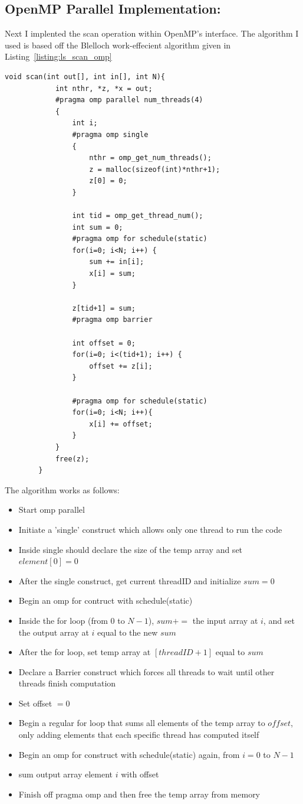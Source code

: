 	\newpage
	\subsection{OpenMP Parallel Implementation:}
	Next I implented the scan operation within OpenMP's interface. The algorithm I used is based off the Blelloch\cite{Prefixsumwiki} work-effecient algorithm given in Listing~\ref{listing:ls_scan_omp}
	\begin{lstlisting}[caption={OpenMP Parallel algorithm for computing scan operation\cite{PrefixsumCSE}.}, label={listing:ls_scan_omp}]
		void scan(int out[], int in[], int N){
			int nthr, *z, *x = out;
			#pragma omp parallel num_threads(4)
			{
				int i;
				#pragma omp single
				{
					nthr = omp_get_num_threads();
					z = malloc(sizeof(int)*nthr+1);
					z[0] = 0;
				}
				
				int tid = omp_get_thread_num();
				int sum = 0;
				#pragma omp for schedule(static)
				for(i=0; i<N; i++) {
					sum += in[i];
					x[i] = sum;
				}
				
				z[tid+1] = sum;
				#pragma omp barrier
				
				int offset = 0;
				for(i=0; i<(tid+1); i++) {
					offset += z[i];
				}
				
				#pragma omp for schedule(static)
				for(i=0; i<N; i++){
					x[i] += offset;
				}
			}
			free(z);
		}
	\end{lstlisting}

	The algorithm works as follows:
	\begin{itemize}
		\item Start omp parallel
		\item Initiate a 'single' construct which allows only one thread to run the code
		\item Inside single should declare the size of the temp array and set $element[0] = 0$
		\item After the single construct, get current threadID and initialize $sum =0$
		\item Begin an omp for contruct with schedule(static)
		\item Inside the for loop (from $0$ to $N-1$), $sum +=$ the input array at $i$, and set the output array at $i$ equal to the new $sum$
		\item After the for loop, set temp array at $[threadID+1]$ equal to $sum$
		\item Declare a Barrier construct which forces all threads to wait until other threads finish computation
		\item Set offset $= 0$ 
		\item Begin a regular for loop that sums all elements of the temp array to $offset$, only adding elements that each specific thread has computed itself
		\item Begin an omp for construct with schedule(static) again, from $i = 0$ to $N-1$
		\item sum output array element $i$ with offset
		\item Finish off pragma omp and then free the temp array from memory
	\end{itemize}
	
